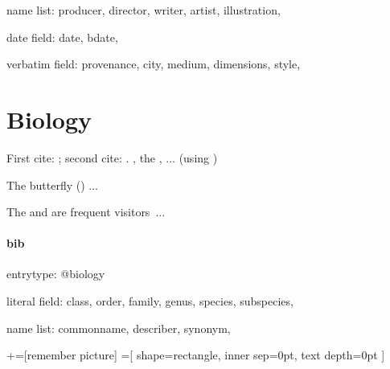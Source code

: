 name list: producer,
  director,
  writer,
  artist,
  illustration,
  
  date field: date,
 bdate,
 
 verbatim field: provenance,
  city,
  medium,
  dimensions,
  style,


\ddivider
 

\section{Biology}

First cite: ; second cite: . , the , ... (using )

\medskip
{}
The 	
butterfly (\citetrackerfalse{}\citetrackertrue) ...








\medskip
{}



\medskip
The  and  are frequent visitors~...





\paragraph{bib}

entrytype: 	@biology

literal field:
	class,
	order,
	family,
  genus,
  species,
  subspecies,


name list:
  commonname,
  describer,
  synonym,

\ddivider


+=[remember picture]
=[
	shape=rectangle,
	inner sep=0pt,
	text depth=0pt
]






